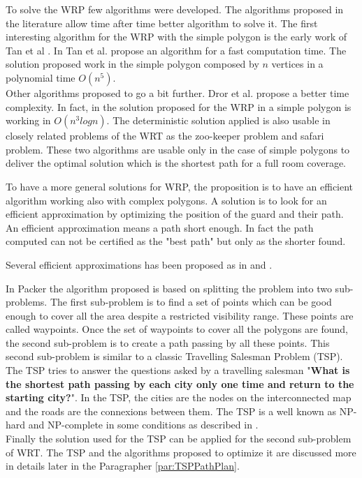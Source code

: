 To solve the WRP few algorithms were developed. The algorithms proposed in the literature allow  time after time better algorithm  to solve it. The first interesting algorithm for the WRP with the simple polygon is the early work of Tan et al \cite{234*tan2001}. In Tan et al.\citep{234*tan2001}  propose an algorithm for a fast computation time. The solution proposed work in the simple polygon composed by $n$ vertices in a polynomial time $O(n^5)$. \\
Other algorithms proposed to go a bit further. Dror et al. \cite{233*dror2003} propose a better time complexity. In fact, in \cite{233*dror2003} the solution proposed for the WRP in a simple polygon is working in $O(n^3 log n)$.  The deterministic solution applied is also usable in closely related problems of the WRT as the zoo-keeper problem and safari problem.
These two algorithms \citep{234*tan2001,233*dror2003} are usable only in the case of simple polygons to deliver the optimal solution which is the shortest path for a full room coverage. 

To have a more general solutions for WRP, the proposition is to have an efficient algorithm working also with complex polygons. A solution is to look for an efficient approximation by optimizing the position of the guard and their path. An efficient approximation means a path short enough. In fact the path computed can not be certified as the "best path" but only as the shorter found.

Several efficient approximations has been proposed as in \citep{235*faigl2010} and \citep{53*packer2008}. 

In Packer \citep{53*packer2008}  the algorithm proposed is based on splitting the problem into two sub-problems. The first sub-problem is to find a set of points which can be good enough to cover all the area despite a restricted visibility range. These points are called waypoints.  
Once the set of waypoints to cover all the polygons are found, the second sub-problem is to create a path passing by all these points. 
 This second sub-problem is similar to a classic Travelling Salesman Problem (TSP). The TSP tries to answer the questions asked by a travelling salesman "\textbf{What is the shortest path passing by each city only one time and return to the starting city?}".
  In the TSP, the cities are the nodes on the interconnected map and the roads are the connexions between them. The TSP is a well known as NP-hard and NP-complete in  some conditions as described in \citep{236*karp1972}. \\ 
Finally the solution used for the TSP can be applied for the second sub-problem of WRT.
 The TSP and the algorithms proposed to optimize it are discussed more in details later in the Paragrapher \ref{par:TSPPathPlan}.


